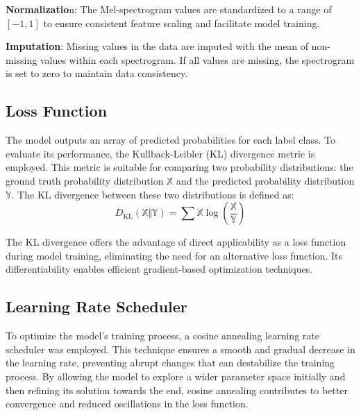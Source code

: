 \documentclass[conference]{IEEEtran}
\newcommand{\XX}{{\mathbb{X}}}
\newcommand{\YY}{{\mathbb{Y}}}
\begin{document}
\textbf{Normalizatio}n: The Mel-spectrogram values are standardized to a range
of $[-1,1]$ to ensure consistent feature scaling and facilitate model training.


\textbf{Imputation}: Missing values in the data are imputed with the mean of
non-missing values within each spectrogram. If all values are missing,
the spectrogram is set to zero to maintain data consistency.


\subsection{Loss Function}


The model outputs an array of predicted probabilities for each label class.
To evaluate its performance, the Kullback-Leibler (KL) divergence metric is
employed. This metric is suitable for comparing two probability distributions: 
the ground truth probability distribution $\XX$ and the predicted probability
distribution $\YY$. The KL divergence between these two distributions is
defined as:
\begin{equation*}
D_\mathrm{KL}(\XX \Vert \YY) = \sum \XX \log\left(\frac{\XX}{\YY}\right)
\end{equation*}


The KL divergence offers the advantage of direct applicability as a loss
function during model training, eliminating the need for an alternative loss
function. Its differentiability enables efficient gradient-based optimization
techniques.


\subsection{Learning Rate Scheduler}


To optimize the model's training process, a cosine annealing learning rate
scheduler was employed. This technique ensures a smooth and gradual decrease in
the learning rate, preventing abrupt changes that can destabilize the training
process. By allowing the model to explore a wider parameter space initially and
then refining its solution towards the end, cosine annealing contributes to
better convergence and reduced oscillations in the loss function.
\end{document}
